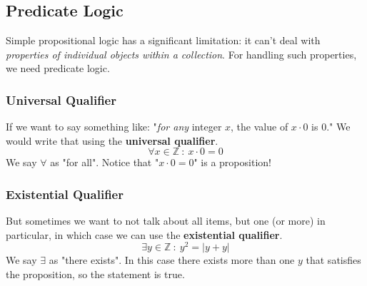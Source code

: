 \documentclass[10pt]{article}
\begin{document}
\subsection*{Predicate Logic}
Simple propositional logic has a significant limitation: it can't deal with \textit{properties of individual objects within a collection}.  For handling such properties, we need predicate logic.

\subsubsection*{Universal Qualifier}
If we want to say something like: "\textit{for any} integer $x$, the value of $x \cdot 0$ is $0$."  We would write that using the \textbf{universal qualifier}.
\[\forall x \in \mathbb{Z}\::\: x \cdot 0 = 0\]
We say $\forall$ as "for all".  Notice that "$x \cdot 0 = 0$" is a proposition!

\subsubsection*{Existential Qualifier}
But sometimes we want to not talk about all items, but one (or more) in particular, in which case we can use the \textbf{existential qualifier}.
\[\exists y \in \mathbb{Z} \::\: y^2 = \vert y + y \vert\]
We say $\exists$ as "there exists".  In this case there exists more than one $y$ that satisfies the proposition, so the statement is true.
\end{document}
